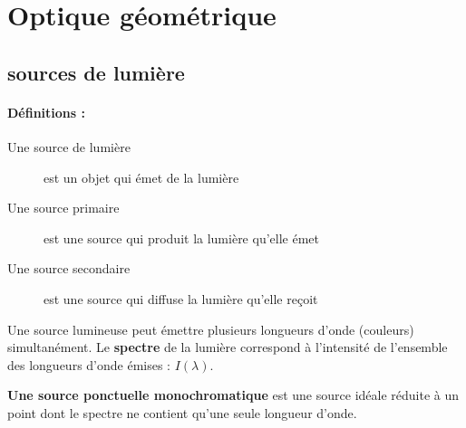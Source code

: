 \documentclass{cours}
\begin{document}
\setcounter{section}{0}
\chapter{Optique géométrique}
\section{sources de lumière}
\subsubsection{Définitions :}
\begin{description}
\item[Une source de lumière] est un objet qui émet de la lumière
\item[Une source primaire] est une source qui produit la lumière qu'elle émet
\item[Une source secondaire] est une source qui diffuse la lumière qu'elle reçoit
\end{description}

Une source lumineuse peut émettre plusieurs longueurs d'onde (couleurs) simultanément. Le \textbf{spectre} de la lumière correspond à l'intensité de l'ensemble des longueurs d'onde émises : $I(\lambda)$.

\begin{center}
\usetikzlibrary{decorations.pathmorphing}
\end{center}

\textbf{Une source ponctuelle monochromatique} est une source idéale réduite à un point dont le spectre ne contient qu'une seule longueur d'onde. 
\end{document}
